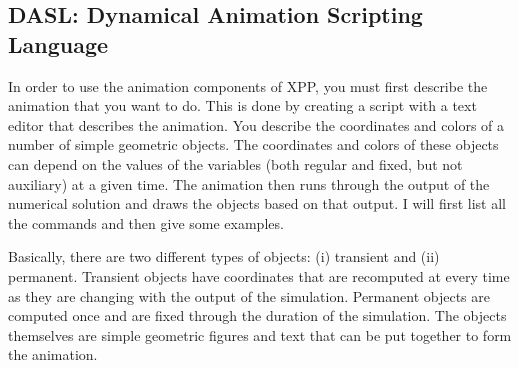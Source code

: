 \documentclass{article}
\begin{document}
\subsection{ DASL: Dynamical Animation Scripting Language}
In order to use the animation components of XPP, you must first
describe the animation that you want to do. This is done by creating a
script with a text editor that describes the animation. You describe
the coordinates and colors of a number of simple geometric
objects. The coordinates and colors of these objects can depend on the
values of the variables (both regular and fixed, but not auxiliary) at
a given time. The animation then runs through the output of the
numerical solution and draws the objects based on that output. I will
first list all the commands and then give some examples. 

Basically,
there are two different types of objects: (i) transient and (ii)
permanent. Transient objects have coordinates that are recomputed at
every time as they are changing with the output of the
simulation. Permanent objects are computed once and are fixed through
the duration of the simulation. The objects themselves are simple
geometric figures and text that can be put together to form the
animation.
\end{document}
